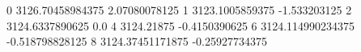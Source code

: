 0 3126.70458984375 2.07080078125
1 3123.1005859375 -1.533203125
2 3124.6337890625 0.0
4 3124.21875 -0.4150390625
6 3124.114990234375 -0.518798828125
8 3124.37451171875 -0.25927734375
